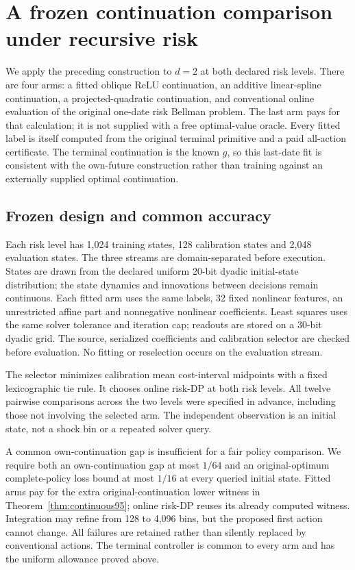 \section{A frozen continuation comparison under recursive risk}\label{sec:study95}
We apply the preceding construction to $d=2$ at both declared risk levels. There are four arms: a fitted oblique ReLU continuation, an additive linear-spline continuation, a projected-quadratic continuation, and conventional online evaluation of the original one-date risk Bellman problem. The last arm pays for that calculation; it is not supplied with a free optimal-value oracle. Every fitted label is itself computed from the original terminal primitive and a paid all-action certificate. The terminal continuation is the known $g$, so this last-date fit is consistent with the own-future construction rather than training against an externally supplied optimal continuation.

\subsection{Frozen design and common accuracy}
Each risk level has 1,024 training states, 128 calibration states and 2,048 evaluation states. The three streams are domain-separated before execution. States are drawn from the declared uniform 20-bit dyadic initial-state distribution; the state dynamics and innovations between decisions remain continuous. Each fitted arm uses the same labels, 32 fixed nonlinear features, an unrestricted affine part and nonnegative nonlinear coefficients. Least squares uses the same solver tolerance and iteration cap; readouts are stored on a 30-bit dyadic grid. The source, serialized coefficients and calibration selector are checked before evaluation. No fitting or reselection occurs on the evaluation stream.

The selector minimizes calibration mean cost-interval midpoints with a fixed lexicographic tie rule. It chooses online risk-DP at both risk levels. All twelve pairwise comparisons across the two levels were specified in advance, including those not involving the selected arm. The independent observation is an initial state, not a shock bin or a repeated solver query.

A common own-continuation gap is insufficient for a fair policy comparison. We require both an own-continuation gap at most $1/64$ and an original-optimum complete-policy loss bound at most $1/16$ at every queried initial state. Fitted arms pay for the extra original-continuation lower witness in Theorem~\ref{thm:continuous95}; online risk-DP reuses its already computed witness. Integration may refine from 128 to 4,096 bins, but the proposed first action cannot change. All failures are retained rather than silently replaced by conventional actions. The terminal controller is common to every arm and has the uniform allowance proved above.


